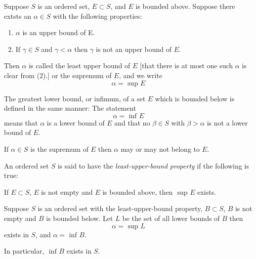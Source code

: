 \begin{defn}
    \label{supremum}
    Suppose $S$ is an ordered set, $E \subset S$, and $E$ is bounded above. 
    Suppose there extsts an $\alpha \in S$ with the following properties: 
    \begin{enumerate}
        \item $\alpha$ is an upper bound of E. 
        \item If $\gamma \in S$ and $\gamma < \alpha$ then $\gamma$ is not an upper bound of $E$.
    \end{enumerate}
    Then $\alpha$ is called the least upper bound of $E$ 
    [that there is at most one such $\alpha$ is clear from (2).] 
    or the supremum of $E$, and we write $$ \alpha = \text{ sup } E $$
    
    The greatest lower bound, or infimum, of a set $E$ which is bounded below is defined in the same manner: 
    The statement $$ \alpha = \text{ inf } E $$ means that $\alpha$ is a lower bound of $E$ 
    and that no $\beta \in S$ with $\beta > \alpha$ is not a lower bound of $E$.
\end{defn}

\begin{rem}
    If $\alpha \in S$ is the supremum of $E$ then $\alpha$ may or may not belong to $E$.
\end{rem}

\begin{defn}
    An ordered set $S$ is said to have the {\it least-upper-bound property} if the following is true:
    
    If $E \subset S$, $E$ is not empty and $E$ is bounded above, then $\text{ sup } E$ exists.
\end{defn}

\pagebreak

\begin{thm}
    Suppose $S$ is an ordered set with the least-upper-bound property, 
    $B \subset S$, $B$ is not empty and $B$ is bounded below.
    Let $L$ be the set of all lower bounds of $B$ then $$ \alpha = \text{ sup } L $$
    exists in $S$, and $\alpha = \text{ inf } B$.

    In particular, $\text{ inf } B$ exists in $S$.
\end{thm}

